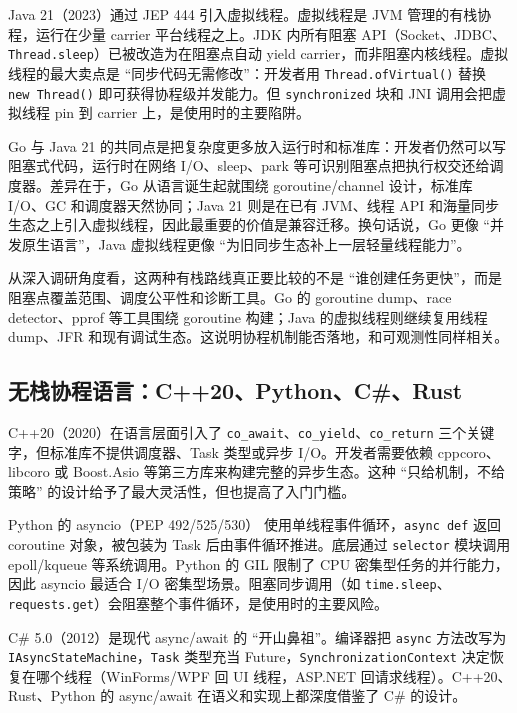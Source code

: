\documentclass[UTF8,a4paper,12pt]{ctexart}
\begin{document}
Java 21（2023）通过 JEP 444 引入虚拟线程\cite{jep444}。虚拟线程是 JVM 管理的有栈协程，运行在少量 carrier 平台线程之上。JDK 内所有阻塞 API（Socket、JDBC、\verb|Thread.sleep|）已被改造为在阻塞点自动 yield carrier，而非阻塞内核线程。虚拟线程的最大卖点是 ``同步代码无需修改''：开发者用 \verb|Thread.ofVirtual()| 替换 \verb|new Thread()| 即可获得协程级并发能力。但 \verb|synchronized| 块和 JNI 调用会把虚拟线程 pin 到 carrier 上，是使用时的主要陷阱。

Go 与 Java 21 的共同点是把复杂度更多放入运行时和标准库：开发者仍然可以写阻塞式代码，运行时在网络 I/O、sleep、park 等可识别阻塞点把执行权交还给调度器。差异在于，Go 从语言诞生起就围绕 goroutine/channel 设计，标准库 I/O、GC 和调度器天然协同；Java 21 则是在已有 JVM、线程 API 和海量同步生态之上引入虚拟线程，因此最重要的价值是兼容迁移。换句话说，Go 更像 ``并发原生语言''，Java 虚拟线程更像 ``为旧同步生态补上一层轻量线程能力''。

从深入调研角度看，这两种有栈路线真正要比较的不是 ``谁创建任务更快''，而是阻塞点覆盖范围、调度公平性和诊断工具。Go 的 goroutine dump、race detector、pprof 等工具围绕 goroutine 构建；Java 的虚拟线程则继续复用线程 dump、JFR 和现有调试生态。这说明协程机制能否落地，和可观测性同样相关。

\subsection{无栈协程语言：C++20、Python、C\#、Rust}

C++20（2020）在语言层面引入了 \verb|co_await|、\verb|co_yield|、\verb|co_return| 三个关键字，但标准库不提供调度器、Task 类型或异步 I/O。开发者需要依赖 cppcoro、libcoro 或 Boost.Asio 等第三方库来构建完整的异步生态。这种 ``只给机制，不给策略'' 的设计给予了最大灵活性，但也提高了入门门槛。

Python 的 asyncio（PEP 492/525/530）\cite{pep492} 使用单线程事件循环，\verb|async def| 返回 coroutine 对象，被包装为 Task 后由事件循环推进。底层通过 \verb|selector| 模块调用 epoll/kqueue 等系统调用。Python 的 GIL 限制了 CPU 密集型任务的并行能力，因此 asyncio 最适合 I/O 密集型场景。阻塞同步调用（如 \verb|time.sleep|、\verb|requests.get|）会阻塞整个事件循环，是使用时的主要风险。

C\# 5.0（2012）是现代 async/await 的 ``开山鼻祖''。编译器把 \verb|async| 方法改写为 \verb|IAsyncStateMachine|，\verb|Task| 类型充当 Future，\verb|SynchronizationContext| 决定恢复在哪个线程（WinForms/WPF 回 UI 线程，ASP.NET 回请求线程）。C++20、Rust、Python 的 async/await 在语义和实现上都深度借鉴了 C\# 的设计。
\end{document}
